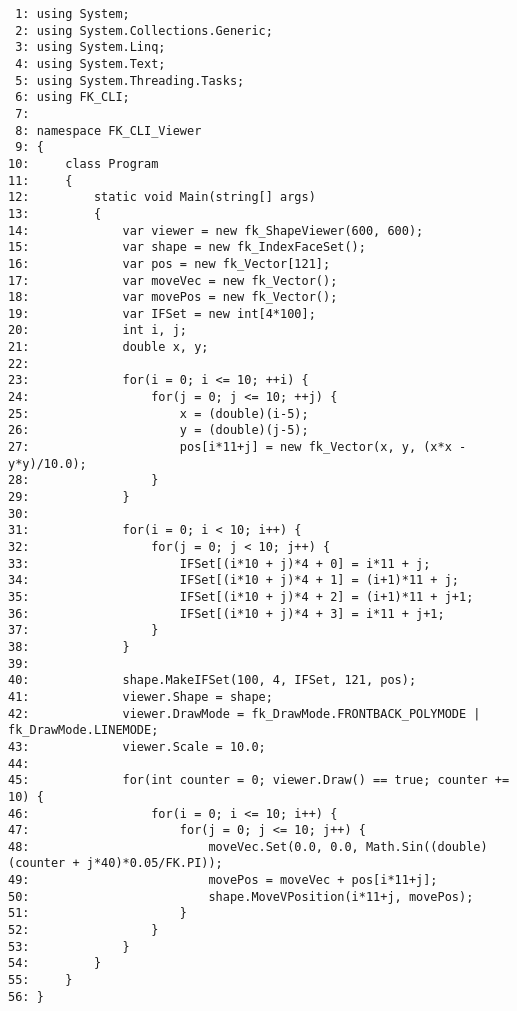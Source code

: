 \begin{breakbox}
\begin{small}
\begin{verbatim}
 1: using System;
 2: using System.Collections.Generic;
 3: using System.Linq;
 4: using System.Text;
 5: using System.Threading.Tasks;
 6: using FK_CLI;
 7: 
 8: namespace FK_CLI_Viewer
 9: {
10:     class Program
11:     {
12:         static void Main(string[] args)
13:         {
14:             var viewer = new fk_ShapeViewer(600, 600);
15:             var shape = new fk_IndexFaceSet();
16:             var pos = new fk_Vector[121];
17:             var moveVec = new fk_Vector();
18:             var movePos = new fk_Vector();
19:             var IFSet = new int[4*100];
20:             int i, j;
21:             double x, y;
22: 
23:             for(i = 0; i <= 10; ++i) {
24:                 for(j = 0; j <= 10; ++j) {
25:                     x = (double)(i-5);
26:                     y = (double)(j-5);
27:                     pos[i*11+j] = new fk_Vector(x, y, (x*x - y*y)/10.0);
28:                 }
29:             }
30: 
31:             for(i = 0; i < 10; i++) {
32:                 for(j = 0; j < 10; j++) {
33:                     IFSet[(i*10 + j)*4 + 0] = i*11 + j;
34:                     IFSet[(i*10 + j)*4 + 1] = (i+1)*11 + j;
35:                     IFSet[(i*10 + j)*4 + 2] = (i+1)*11 + j+1;
36:                     IFSet[(i*10 + j)*4 + 3] = i*11 + j+1;
37:                 }
38:             }
39: 
40:             shape.MakeIFSet(100, 4, IFSet, 121, pos);
41:             viewer.Shape = shape;
42:             viewer.DrawMode = fk_DrawMode.FRONTBACK_POLYMODE | fk_DrawMode.LINEMODE;
43:             viewer.Scale = 10.0;
44: 
45:             for(int counter = 0; viewer.Draw() == true; counter += 10) {
46:                 for(i = 0; i <= 10; i++) {
47:                     for(j = 0; j <= 10; j++) {
48:                         moveVec.Set(0.0, 0.0, Math.Sin((double)(counter + j*40)*0.05/FK.PI));
49:                         movePos = moveVec + pos[i*11+j];
50:                         shape.MoveVPosition(i*11+j, movePos);
51:                     }
52:                 }
53:             }
54:         }
55:     }
56: }
\end{verbatim}
\end{small}
\end{breakbox}


